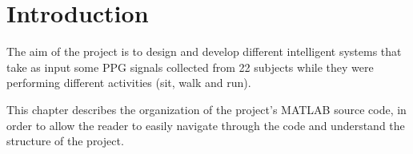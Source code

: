 \chapter{Introduction}\label{ch:intro}

The aim of the project is to design and develop different intelligent systems
that take as input some PPG signals collected from 22 subjects while they were
performing different activities (sit, walk and run).

This chapter describes the organization of the project's MATLAB source code, in
order to allow the reader to easily navigate through the code and understand
the structure of the project.


